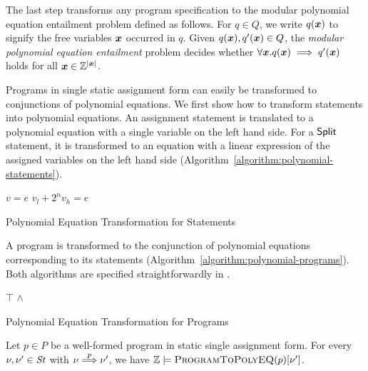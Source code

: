 
The last step transforms any program specification to the 
modular polynomial equation entailment problem defined as follows. For
$q \in Q$, we write $q(\vx)$ to signify the free variables $\vx$
occurred in $q$. Given $q(\vx), q'(\vx) \in Q$, the \emph{modular
  polynomial equation entailment} problem decides whether $\forall
\vx. q(\vx) \implies q'(\vx)$ holds for all $\vx \in \bbfZ^{|\vx|}$.

Programs in single static assignment form can easily be transformed to
conjunctions of polynomial equations. We first show how to transform
statements into polynomial equations. An assignment statement is
translated to a polynomial equation with a single variable on the left
hand side. For a $\mbox{\textsf{Split}}$ statement, it is transformed to an
equation with a linear expression of the assigned variables on the
left hand side (Algorithm~\ref{algorithm:polynomial-statements}). 
\begin{algorithm}
  \begin{algorithmic}[1]
        \Return $v = e$
      \EndCase
        \Return $v_l + 2^n v_h = e$
      \EndCase
    \EndMatch
    \EndFunction
  \end{algorithmic}
  \caption{Polynomial Equation Transformation for Statements}
  \label{algorithm:polynomial-statements}
\end{algorithm}

A program is transformed to the conjunction of polynomial
equations corresponding to its statements
(Algorithm~\ref{algorithm:polynomial-programs}). Both algorithms are
specified straightforwardly in \coq.

\begin{algorithm}
  \begin{algorithmic}[1]
      \Case{$\epsilon$} \Return $\top$ \EndCase
        \Return {} $\wedge$
      \EndCase
    \EndMatch
    \EndFunction
  \end{algorithmic}
  \caption{Polynomial Equation Transformation for Programs}
  \label{algorithm:polynomial-programs}
\end{algorithm}



\begin{theorem}
  Let $p \in P$ be a well-formed program in static single assignment
  form. For every $\nu, \nu' \in \mathit{St}$ with $\nu \overset{p}{\Longrightarrow} \nu'$, 
  we have $\mathbb{Z} \models \textsc{ProgramToPolyEQ}(p) [\nu']$.
\end{theorem}


